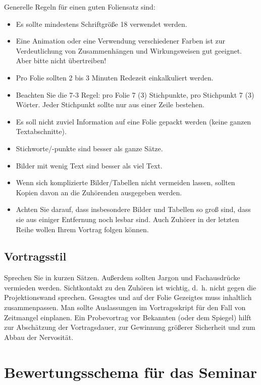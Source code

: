 \documentclass[final,bibliography=totocnumbered]{include/sikseminar}
\begin{document}
Generelle Regeln für einen guten Foliensatz sind:
\begin{itemize}
	\item Es sollte mindestens Schriftgröße 18 verwendet werden.
	\item Eine Animation oder eine Verwendung verschiedener Farben ist zur Verdeutlichung von Zusammenhängen und Wirkungsweisen gut geeignet. Aber bitte nicht übertreiben!
	\item Pro Folie sollten 2 bis 3 Minuten Redezeit einkalkuliert werden.
	\item Beachten Sie die 7-3 Regel: pro Folie 7 (\textpm{}3) Stichpunkte, pro Stichpunkt 7 (\textpm{}3) Wörter. Jeder Stichpunkt sollte nur aus einer Zeile bestehen.
	\item Es soll nicht zuviel Information auf eine Folie gepackt werden (keine ganzen Textabschnitte).
	\item Stichworte/-punkte sind besser als ganze Sätze.
	\item Bilder mit wenig Text sind besser als viel Text.
	\item Wenn sich komplizierte Bilder/Tabellen nicht vermeiden lassen, sollten Kopien davon an die Zuhörenden ausgegeben werden.
	\item Achten Sie darauf, dass insbesondere Bilder und Tabellen so groß sind, dass sie aus einiger Entfernung noch lesbar sind. Auch Zuhörer in der letzten Reihe wollen Ihrem Vortrag folgen können.
\end{itemize}

\subsection{Vortragsstil}
Sprechen Sie in kurzen Sätzen. Außerdem sollten Jargon und Fachausdrücke vermieden werden.
Sichtkontakt zu den Zuhören ist wichtig, d.~h. nicht gegen die Projektionswand sprechen. 
Gesagtes und auf der Folie Gezeigtes muss inhaltlich zusammenpassen.
Man sollte Auslassungen im Vortragsskript für den Fall von Zeitmangel einplanen.
Ein Probevortrag vor Bekannten (oder dem Spiegel) hilft zur Abschätzung der Vortragsdauer, zur Gewinnung größerer Sicherheit und zum Abbau der Nervosität.

 


\section{Bewertungsschema für das Seminar}
\end{document}

